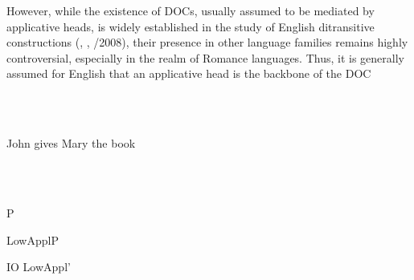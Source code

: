 \documentclass[output=paper,modfonts,nonflat]{langsci/langscibook}
\begin{document}
\begin{stylePrrafodelista}
\textmd{However, while the existence of DOCs, usually assumed to be mediated by applicative heads, is widely established in the study of English ditransitive constructions (\citealt{Baker1988}, \citealt{Marantz1993}, \citealt{Pylkkänen2002}/2008), their presence in other language families remains highly controversial, especially in the realm of Romance languages. Thus, it is generally assumed for English that an applicative head is the backbone of the DOC} \hyperlink{bookmark}{} \hyperlink{bookmark1}{}\textstyleHyperlink{:}
\end{stylePrrafodelista}

\begin{styleListNumberi}
\ea%
    \label{ex:key:1}
    \gll\\
        \\
    \glt
    \z

         John gives Mary the book
\end{styleListNumberi}

\begin{styleBodyA}
\ea%
    \label{ex:key:2}
    \gll\\
        \\
    \glt
    \z

           P
\end{styleBodyA}

\begin{styleBodyA}
\end{styleBodyA}

\begin{styleBodyA}
             LowApplP
\end{styleBodyA}

\begin{styleBodyA}
\end{styleBodyA}

\begin{styleBodyA}
                      IO         LowAppl’
\end{styleBodyA}

\begin{styleBodyA}
\end{styleBodyA}
\end{document}
